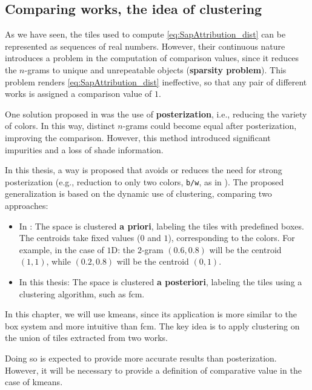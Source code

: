 \subsection{Comparing works, the idea of clustering}
\begin{modified}
As we have seen, the tiles used to compute \cref{eq:SapAttribution_dist} can be represented as sequences of real numbers. However, their continuous nature introduces a problem in the computation of comparison values, since it reduces the $n$-grams to unique and unrepeatable objects (\textbf{sparsity problem}). This problem renders \cref{eq:SapAttribution_dist} ineffective, so that any pair of different works is assigned a comparison value of $1$.

\noindent One solution proposed in \cite{thesis} was the use of \textbf{posterization}, i.e., reducing the variety of colors. In this way, distinct $n$-grams could become equal after posterization, improving the comparison. However, this method introduced significant impurities and a loss of shade information.

\noindent In this thesis, a way is proposed that avoids or reduces the need for strong posterization (e.g., reduction to only two colors, \texttt{b/w}, as in \cite{thesis}). The proposed generalization is based on the dynamic use of clustering, comparing two approaches:

\begin{itemize}
	\item In \cite{thesis}: The space is clustered \textbf{a priori}, labeling the tiles with predefined boxes. The centroids take fixed values ($0$ and $1$), corresponding to the colors. For example, in the case of $1$D: the $2$-gram $(0.6, 0.8)$ will be the centroid $(1,1)$, while $(0.2, 0.8)$ will be the centroid $(0,1)$.
	\item In this thesis: The space is clustered \textbf{a posteriori}, labeling the tiles using a clustering algorithm, such as \gls{fcm}.
\end{itemize}

\noindent In this chapter, we will use \gls{kmeans}, since its application is more similar to the box system and more intuitive than \gls{fcm}. The key idea is to apply clustering on the union of tiles extracted from two works.

\noindent Doing so is expected to provide more accurate results than posterization. However, it will be necessary to provide a definition of comparative value in the case of \gls{kmeans}.
\end{modified}

